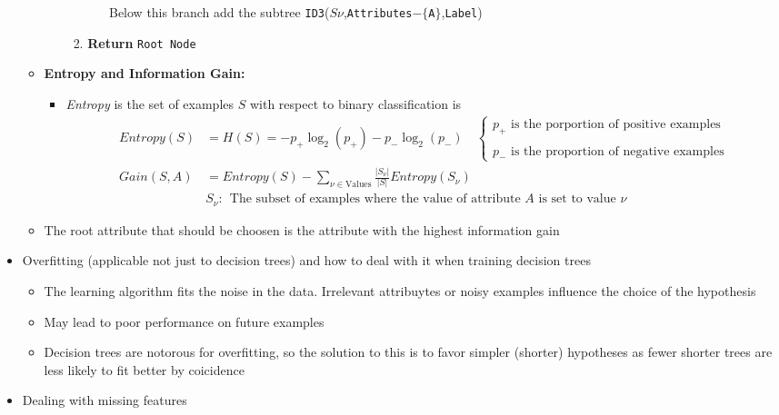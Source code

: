 \documentclass{article}
\begin{document}
\begin{itemize}
\begin{itemize}
\begin{enumerate}
\begin{enumerate}
\begin{enumerate}
				\hspace{1em} Below this branch add the subtree \verb~ID3~($S\nu$,{\tt Attributes}$-\{${\tt A}$\}$,{\tt Label})
				\end{enumerate}
			\item {\bf Return} \verb~Root Node~
			\end{enumerate}
		\end{enumerate}
	\item {\bf Entropy and Information Gain:}
		\begin{itemize}
		\item {\em Entropy} is the set of examples $S$ with respect to binary classification is
		\begin{align*}
		Entropy(S) &= H(S) = -p_{+}\log_{2}\left(p_{+}\right)-p_{-}\log_{2}\left(p_{-}\right)\quad \left\{\begin{matrix}
p_{+}\text{ is the porportion of positive examples} \\\ \\
p_{-}\text{ is the proportion of negative examples}
\end{matrix}\right.\\
		Gain(S,A) &= Entropy(S) - \sum_{\nu\in\text{Values}}\frac{\left|S_{\nu}\right|}{\left| S\right|}Entropy\left(S_{\nu}\right)\\
		&S_{\nu}:  \ \ \text{The subset of examples where the value of attribute $A$ is set to value $\nu$}
		\end{align*}
		\end{itemize}
	\item The root attribute that should be choosen is the attribute with the highest information gain
	\end{itemize}
\item Overfitting (applicable not just to decision trees) and how to deal with it when training decision trees
	\begin{itemize}
	\item The learning algorithm fits the noise in the data. Irrelevant attribuytes or noisy examples influence the choice of the hypothesis
	\item May lead to poor performance on future examples
	\item Decision trees are notorous for overfitting, so the solution to this is to favor simpler (shorter) hypotheses as fewer shorter trees are less likely to fit better by coicidence
	\end{itemize}
\item Dealing with missing features
	\begin{itemize}

\end{itemize}
\end{itemize}
\end{document}
